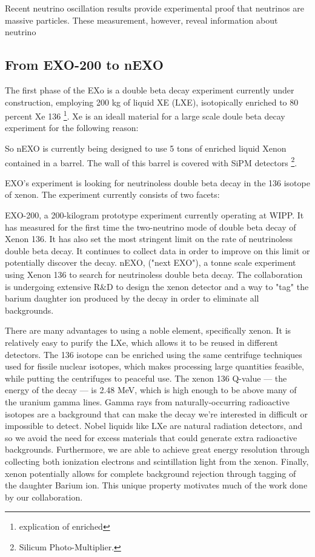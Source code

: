\documentclass[a4paper, 11pt]{report}%
\begin{document}
  
  Recent neutrino oscillation results provide experimental proof that neutrinos 
  are massive particles. These measurement, however, reveal information about 
  neutrino 
  
  \subsection{From EXO-200 to nEXO}
  
  The first phase of the EXo is a double beta decay experiment currently under construction, 
  employing 200 kg of liquid XE (LXE), isotopically enriched to 80 percent Xe 136 
  \footnote{explication of enriched}. Xe is an ideall material for a large scale
  doule beta decay experiment for the following reason:
  
  So nEXO is currently being designed to use 5 tons of enriched liquid Xenon contained in a barrel. The wall of this barrel is covered 
  with SiPM detectors \footnote{Silicum Photo-Multiplier.}.
  
  EXO's experiment is looking for neutrinoless double beta decay in the 136 isotope of xenon. The experiment currently consists of 
  two facets:

    EXO-200, a 200-kilogram prototype experiment currently operating at WIPP. It has measured for the first time the two-neutrino mode 
    of double beta decay of Xenon 136. It has also set the most stringent limit on the rate of neutrinoless double beta decay. 
    It continues to collect data in order to improve on this limit or potentially discover the decay.
    nEXO, ("next EXO"), a tonne scale experiment using Xenon 136 to search for neutrinoless double beta decay. The collaboration is 
    undergoing extensive R&D to design the xenon detector and a way to "tag" the barium daughter ion produced by the decay in order 
    to eliminate all backgrounds.

  There are many advantages to using a noble element, specifically xenon. It is relatively easy to purify the LXe, which allows it to 
  be reused in different detectors. The 136 isotope can be enriched using the same centrifuge techniques used for fissile nuclear isotopes,
  which makes processing large quantities feasible, while putting the centrifuges to peaceful use. The xenon 136 Q-value — the energy of 
  the decay — is 2.48 MeV, which is high enough to be above many of the uranium gamma lines. Gamma rays from naturally-occurring 
  radioactive isotopes are a background that can make the decay we're interested in difficult or impossible to detect. Nobel liquids 
  like LXe are natural radiation detectors, and so we avoid the need for excess materials that could generate extra radioactive 
  backgrounds. Furthermore, we are able to achieve great energy resolution through collecting both ionization electrons and scintillation
  light from the xenon. Finally, xenon potentially allows for complete background rejection through tagging of the daughter Barium ion. 
  This unique property motivates much of the work done by our collaboration.
  \\
  
\end{document}
